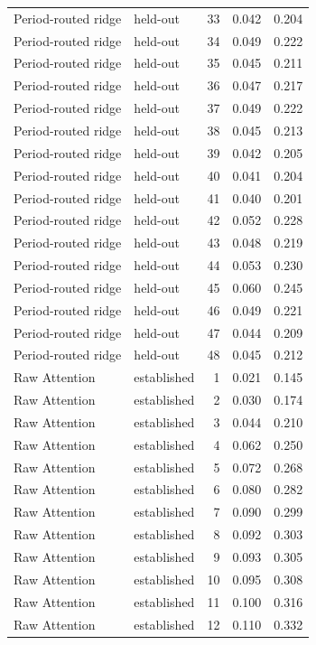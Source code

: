 \begin{tabular}{llrrr}
Period-routed ridge & held-out & 33 & 0.042 & 0.204 \\
Period-routed ridge & held-out & 34 & 0.049 & 0.222 \\
Period-routed ridge & held-out & 35 & 0.045 & 0.211 \\
Period-routed ridge & held-out & 36 & 0.047 & 0.217 \\
Period-routed ridge & held-out & 37 & 0.049 & 0.222 \\
Period-routed ridge & held-out & 38 & 0.045 & 0.213 \\
Period-routed ridge & held-out & 39 & 0.042 & 0.205 \\
Period-routed ridge & held-out & 40 & 0.041 & 0.204 \\
Period-routed ridge & held-out & 41 & 0.040 & 0.201 \\
Period-routed ridge & held-out & 42 & 0.052 & 0.228 \\
Period-routed ridge & held-out & 43 & 0.048 & 0.219 \\
Period-routed ridge & held-out & 44 & 0.053 & 0.230 \\
Period-routed ridge & held-out & 45 & 0.060 & 0.245 \\
Period-routed ridge & held-out & 46 & 0.049 & 0.221 \\
Period-routed ridge & held-out & 47 & 0.044 & 0.209 \\
Period-routed ridge & held-out & 48 & 0.045 & 0.212 \\
Raw Attention & established & 1 & 0.021 & 0.145 \\
Raw Attention & established & 2 & 0.030 & 0.174 \\
Raw Attention & established & 3 & 0.044 & 0.210 \\
Raw Attention & established & 4 & 0.062 & 0.250 \\
Raw Attention & established & 5 & 0.072 & 0.268 \\
Raw Attention & established & 6 & 0.080 & 0.282 \\
Raw Attention & established & 7 & 0.090 & 0.299 \\
Raw Attention & established & 8 & 0.092 & 0.303 \\
Raw Attention & established & 9 & 0.093 & 0.305 \\
Raw Attention & established & 10 & 0.095 & 0.308 \\
Raw Attention & established & 11 & 0.100 & 0.316 \\
Raw Attention & established & 12 & 0.110 & 0.332 \\

\end{tabular}
